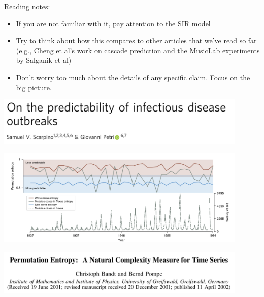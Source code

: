 \documentclass[aspectratio=169]{beamer}
\begin{document}
\begin{frame}

Reading notes:
\begin{itemize}
\item If you are not familiar with it, pay attention to the SIR model 
\pause
\item Try to think about how this compares to other articles that we've read so far (e.g., Cheng et al's work on cascade prediction and the MusicLab experiments by Salganik et al)
\pause
\item Don't worry too much about the details of any specific claim. Focus on the big picture.
\end{itemize}

\end{frame}
\begin{frame}

\begin{center}
\includegraphics[width = 0.9\textwidth]{figures/scarpino_on_2019_title}
\end{center}

\end{frame}
\begin{frame}

\begin{center}
\includegraphics[width = 0.9\textwidth]{figures/scarpino_on_2019_fig1}
\end{center}

\end{frame}
\begin{frame}

\begin{center}
\includegraphics[width = 0.9\textwidth]{figures/bandt_permutation_2002_titie}
\end{center}

\end{frame}
\end{document}

